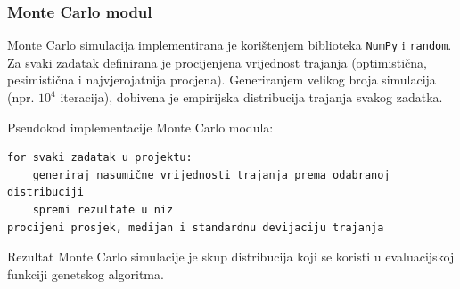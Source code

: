 \subsubsection{Monte Carlo modul}

Monte Carlo simulacija implementirana je korištenjem biblioteka \texttt{NumPy} i \texttt{random}. Za svaki zadatak definirana je procijenjena vrijednost trajanja (optimistična, pesimistična i najvjerojatnija procjena). Generiranjem velikog broja simulacija (npr. $10^4$ iteracija), dobivena je empirijska distribucija trajanja svakog zadatka.

Pseudokod implementacije Monte Carlo modula:
\begin{verbatim}
for svaki zadatak u projektu:
    generiraj nasumične vrijednosti trajanja prema odabranoj distribuciji
    spremi rezultate u niz
procijeni prosjek, medijan i standardnu devijaciju trajanja
\end{verbatim}

Rezultat Monte Carlo simulacije je skup distribucija koji se koristi u evaluacijskoj funkciji genetskog algoritma.

